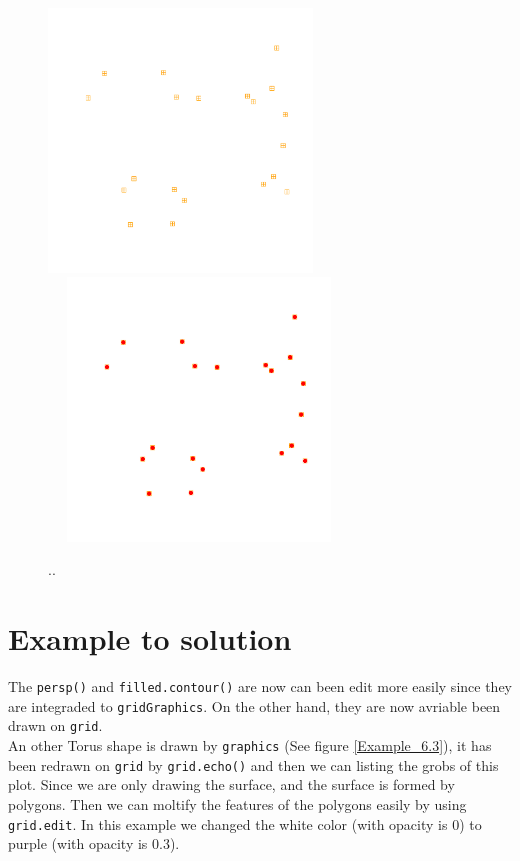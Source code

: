 \documentclass[paper=a4, fontsize=11pt]{report}
\begin{document}
\begin{figure}[h]
\begin{center}
  \includegraphics[height = 7cm, width = 7cm]{figure/Chapter6_example_1.pdf}
  \includegraphics[height = 7cm, width = 8cm]{figure/Chapter6_example_2.pdf}
  \caption{..}
  	\label{Example_6.0}
\end{center}
\end{figure}

\section{Example to solution}
The \texttt{persp()} and \texttt{filled.contour()} are now can been edit more easily since they are integraded to \texttt{gridGraphics}. On the other hand, they are now avriable been drawn on \texttt{grid}.\\

An other Torus shape is drawn by \texttt{graphics} (See figure \ref{Example_6.3}), it has been redrawn on \texttt{grid} by \texttt{grid.echo()} and then we can listing the grobs of this plot. Since we are only drawing the surface, and the surface is formed by polygons. Then we can moltify the features of the polygons easily by using \texttt{grid.edit}. In this example we changed the white color (with opacity is 0) to purple (with opacity is 0.3).\\
\end{document}
